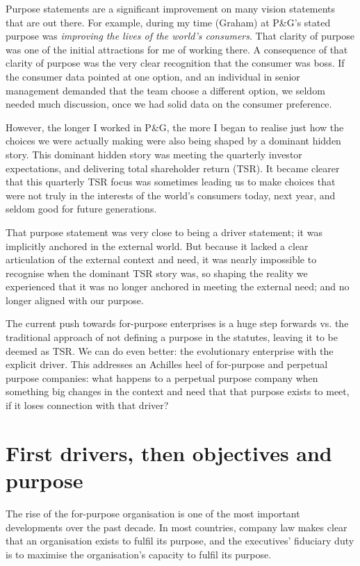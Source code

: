 Purpose statements are a significant improvement on many vision statements that are out there. For example, during my time (Graham) at P\&G’s stated purpose was \emph{improving the lives of the world's consumers}. That clarity of purpose was one of the initial attractions for me of working there. A consequence of that clarity of purpose was the very clear recognition that the consumer was boss. If the consumer data pointed at one option, and an individual in senior management demanded that the team choose a different option, we seldom needed much discussion, once we had solid data on the consumer preference. 


However, the longer I worked in P\&G,  the more I began to realise just how the choices we were actually making were also being shaped by a dominant hidden story. This dominant hidden story was meeting the quarterly investor expectations, and delivering total shareholder return (TSR).  It became clearer that this quarterly TSR focus was sometimes leading us to make choices that were not truly in the interests of the world's consumers today, next year, and seldom good for future generations.


That purpose statement was very close to being a driver statement; it was implicitly anchored in the external world. But because it lacked a clear articulation of the external context and need, it was nearly impossible to recognise when the dominant TSR story was, so shaping the reality we experienced that it was no longer anchored in meeting the external need; and no longer aligned with our purpose.


The current push towards for-purpose enterprises is a huge step forwards vs. the traditional approach of not defining a purpose in the statutes, leaving it to be deemed as TSR. We can do even better: the evolutionary enterprise with the explicit driver. This addresses an Achilles heel of for-purpose and perpetual purpose companies: what happens to a perpetual purpose company when something big changes in the context and need that that purpose exists to meet, if it loses connection with that driver?






\section{First drivers, then objectives and purpose}
\label{section:driver}
The rise of the for-purpose organisation  is one of the most important developments over the past decade. In most countries, company law makes clear that an organisation exists to fulfil its purpose, and the executives’ fiduciary duty is to maximise the organisation’s capacity to fulfil its purpose.



